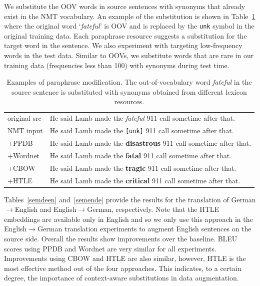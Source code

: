 \gap 

We substitute the OOV words in source sentences with synonyms that already exist in the NMT vocabulary. %
An example of the substitution is shown in Table~\ref{augwnexample} where the original word `\textit{fateful}' is OOV and is replaced by the \texttt{unk} symbol in the original training data.
%
Each paraphrase resource suggests a substitution for the target word in the sentence. %
We also experiment with targeting low-frequency words in the test data. 
Similar to OOVs, we substitute words that are rare in our training data (frequencies less than 100) with synonyms during test time. 

\begin{table}[htb!]
\small
\centering
\begin{tabular}{l l}
\toprule
 {original src} & {He said Lamb made the \textit{fateful} 911 call sometime after that.} \\ 
 {NMT input} & {He said Lamb made the \texttt{[unk]} 911 call sometime after that.} \\ \midrule
 +PPDB   & {He said Lamb made the \textbf{disastrous} 911 call sometime after that.}  \\
+Wordnet &  {He said Lamb made the \textbf{fatal} 911 call sometime after that.}   \\
+CBOW &  {He said Lamb made the \textbf{tragic} 911 call sometime after that.}  \\
+HTLE &  {He said Lamb made the \textbf{critical} 911 call sometime after that.}  \\
\bottomrule
\end{tabular}
 \caption{Examples of paraphrase modification. The out-of-vocabulary word \textit{fateful} in the source sentence is substituted with synonyms obtained from different lexicon resources. \label{augwnexample}}
\end{table}

Tables~\ref{semdeen} and~\ref{semende} provide the results for the translation of German$\rightarrow$English and English$\rightarrow$German, respectively.  
Note that the HTLE embeddings are available only in English and so we only use this approach in the English$\rightarrow$German translation experiments to augment English sentences on the source side.
%
Overall the results show improvements over the baseline. 
BLEU scores using PPDB and Wordnet are very similar for all experiments. %
Improvements using CBOW and HTLE are also similar, however, HTLE is the most effective method out of the four approaches.
This indicates, to a certain degree, the importance of context-aware substitutions in data augmentation.

